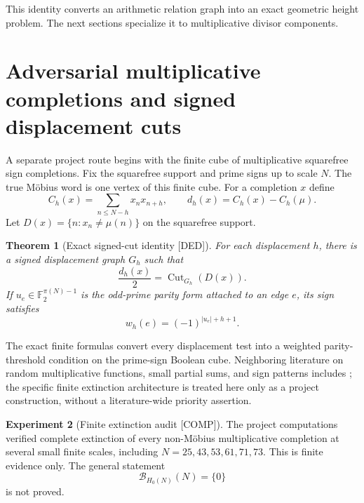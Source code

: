 \documentclass[11pt]{amsart}
\numberwithin{equation}{section}
\theoremstyle{plain}
\newtheorem{theorem}{Theorem}[section]
\theoremstyle{definition}
\newtheorem{experiment}[theorem]{Experiment}
\theoremstyle{remark}
\newcommand{\Mob}{\mu}
\newcommand{\Ftwo}{\mathbb F_2}
\newcommand{\Cut}{\operatorname{Cut}}
\newcommand{\DED}{\textup{[DED]}}
\newcommand{\COMP}{\textup{[COMP]}}
\begin{document}
This identity converts an arithmetic relation graph into an exact geometric height problem.  The next sections
specialize it to multiplicative divisor components.

\section{Adversarial multiplicative completions and signed displacement cuts}
\label{sec:extinction}

A separate project route begins with the finite cube of multiplicative squarefree sign completions.  Fix the
squarefree support and prime signs up to scale $N$.  The true M\"obius word is one vertex of this finite cube.
For a completion $x$ define
\begin{equation}
C_h(x)=\sum_{n\le N-h}x_nx_{n+h},
\qquad
d_h(x)=C_h(x)-C_h(\Mob).
\label{eq:completion-correlation}
\end{equation}
Let $D(x)=\{n:x_n\ne\Mob(n)\}$ on the squarefree support.

\begin{theorem}[Exact signed-cut identity \DED]
\label{thm:signed-cut}
For each displacement $h$, there is a signed displacement graph $G_h$ such that
\begin{equation}
\frac{d_h(x)}{2}=\Cut_{G_h}(D(x)).
\label{eq:signed-cut}
\end{equation}
If $u_e\in\Ftwo^{\pi(N)-1}$ is the odd-prime parity form attached to an edge $e$, its sign satisfies
\begin{equation}
w_h(e)=(-1)^{|u_e|+h+1}.
\label{eq:edge-parity-law}
\end{equation}
\end{theorem}

The exact finite formulas convert every displacement test into a weighted parity-threshold condition on the
prime-sign Boolean cube.  Neighboring literature on random multiplicative functions, small partial sums, and sign
patterns includes \cite{AymoneSidoravicius2017,KoukoulopoulosSoundararajan2020,MatomakiRadziwillTao2016}; the
specific finite extinction architecture is treated here only as a project construction, without a literature-wide
priority assertion.

\begin{experiment}[Finite extinction audit \COMP]
\label{exp:finite-extinction}
The project computations verified complete extinction of every non-M\"obius multiplicative completion at several
small finite scales, including $N=25,43,53,61,71,73$.  This is finite evidence only.  The general statement
\begin{equation}
\mathcal B_{H_0(N)}(N)=\{0\}
\label{eq:general-extinction-target}
\end{equation}
is not proved.
\end{experiment}
\end{document}
